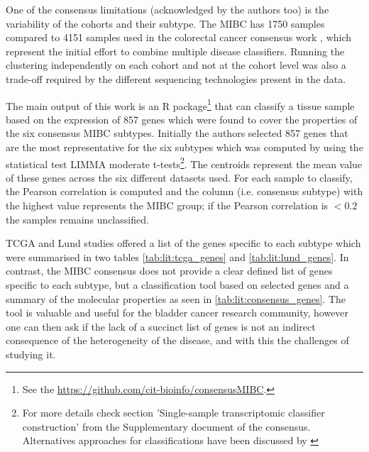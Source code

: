 One of the consensus limitations (acknowledged by the authors too) is the variability of the cohorts and their subtype. The MIBC has 1750 samples compared to 4151 samples used in the colorectal cancer consensus work \cite{Guinney2015-fy}, which represent the initial effort to combine multiple disease classifiers. Running the clustering independently on each cohort and not at the cohort level was also a trade-off required by the different sequencing technologies present in the data. 

The main output of this work is an R package\footnote{See the \url{https://github.com/cit-bioinfo/consensusMIBC}.} that can classify a tissue sample based on the expression of 857 genes which were found to cover the properties of the six consensus MIBC subtypes. Initially the authors selected 857 genes that are the most representative for the six subtypes which was computed by using the statistical test LIMMA moderate t-tests\footnote{For more details check section 'Single-sample transcriptomic classifier construction' from the Supplementary document of the consensus. Alternatives approaches for classifications have been discussed by \citet{Eriksson2022-vw}}. The centroids represent the mean value of these genes across the six different datasets used. For each sample to classify, the Pearson correlation is computed and the column (i.e. consensus subtype) with the highest value represents the MIBC group; if the Pearson correlation is $<0.2$ the samples remains unclassified. 


TCGA and Lund studies offered a list of the genes specific to each subtype which were summarised in two tables \cref{tab:lit:tcga_genes} and \cref{tab:lit:lund_genes}. In contrast, the MIBC consensus does not provide a clear defined list of genes specific to each subtype, but a classification tool based on selected genes and a summary of the molecular properties as seen in \cref{tab:lit:consensus_genes}. The tool is valuable and useful for the bladder cancer research community, however one can then ask if the lack of a succinct list of genes is not an indirect consequence of the heterogeneity of the disease, and with this the challenges of studying it. 

